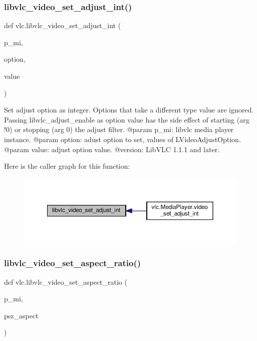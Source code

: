 \subsubsection{\texorpdfstring{libvlc\+\_\+video\+\_\+set\+\_\+adjust\+\_\+int()}{libvlc\_video\_set\_adjust\_int()}}
{\footnotesize\ttfamily def vlc.\+libvlc\+\_\+video\+\_\+set\+\_\+adjust\+\_\+int (\begin{DoxyParamCaption}\item[{}]{p\+\_\+mi,  }\item[{}]{option,  }\item[{}]{value }\end{DoxyParamCaption})}

\begin{DoxyVerb}Set adjust option as integer. Options that take a different type value
are ignored.
Passing libvlc_adjust_enable as option value has the side effect of
starting (arg !0) or stopping (arg 0) the adjust filter.
@param p_mi: libvlc media player instance.
@param option: adust option to set, values of L{VideoAdjustOption}.
@param value: adjust option value.
@version: LibVLC 1.1.1 and later.
\end{DoxyVerb}
 Here is the caller graph for this function\+:
\nopagebreak
\begin{figure}[H]
\begin{center}
\leavevmode
\includegraphics[width=350pt]{namespacevlc_ad26714380b95c5d52496d67b570860ee_icgraph}
\end{center}
\end{figure}
\mbox{\label{namespacevlc_a34236e9eeb606f47fe5fc1f183ff28f8}} 
\subsubsection{\texorpdfstring{libvlc\+\_\+video\+\_\+set\+\_\+aspect\+\_\+ratio()}{libvlc\_video\_set\_aspect\_ratio()}}
{\footnotesize\ttfamily def vlc.\+libvlc\+\_\+video\+\_\+set\+\_\+aspect\+\_\+ratio (\begin{DoxyParamCaption}\item[{}]{p\+\_\+mi,  }\item[{}]{psz\+\_\+aspect }\end{DoxyParamCaption})}

